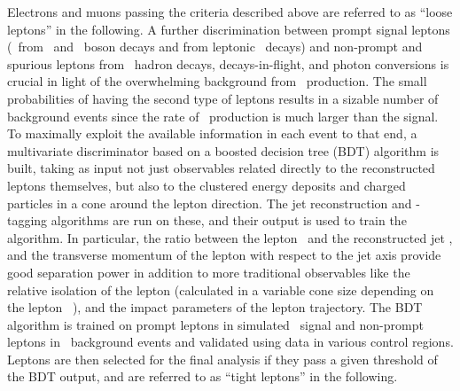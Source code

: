 Electrons and muons passing the criteria described above are referred to as ``loose leptons'' in the following.
A further discrimination between prompt signal leptons (\ie\ from \PW\ and \Z\ boson decays and from leptonic \Pgt\ decays) and non-prompt and spurious leptons from \cPqb\ hadron decays, decays-in-flight, and photon conversions is crucial in light of the overwhelming background from \ttbar\ production.
The small probabilities of having the second type of leptons results in a sizable number of background events since the rate of \ttbar\ production is much larger than the signal.
To maximally exploit the available information in each event to that end, a multivariate discriminator based on a boosted decision tree (BDT) algorithm is built, taking as input not just observables related directly to the reconstructed leptons themselves, but also to the clustered energy deposits and charged particles in a cone around the lepton direction.
The jet reconstruction and \cPqb-tagging algorithms are run on these, and their output is used to train the algorithm.
In particular, the ratio between the lepton \pt\ and the reconstructed jet \pt, and the transverse momentum of the lepton with respect to the jet axis provide good separation power in addition to more traditional observables like the relative isolation of the lepton (calculated in a variable cone size depending on the lepton \pt~\cite{Rehermann:2010vq,SUS-15-008}), and the impact parameters of the lepton trajectory.
The BDT algorithm is trained on prompt leptons in simulated \ttH\ signal and non-prompt leptons in \ttbar\ background events and validated using data in various control regions.
Leptons are then selected for the final analysis if they pass a given threshold of the BDT output, and are referred to as ``tight leptons'' in the following.
